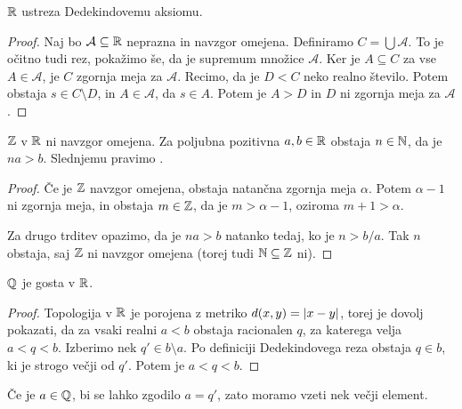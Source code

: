 \begin{trditev}
  $\mathbb{R}$ ustreza Dedekindovemu aksiomu.
\end{trditev}

\begin{proof}
  Naj bo $\mathcal{A} \subseteq \mathbb{R}$ neprazna in navzgor omejena.
  Definiramo $C = \bigcup \mathcal{A}$.
  To je očitno tudi rez, pokažimo še, da je supremum množice $\mathcal{A}$.
  Ker je $A \subseteq C$ za vse $A \in \mathcal{A}$, je $C$ zgornja meja za
  $\mathcal{A}$.
  Recimo, da je $D < C$ neko realno število.
  Potem obstaja $s \in C \setminus D$, in $A \in \mathcal{A}$, da $s \in A$.
  Potem je $A > D$ in $D$ ni zgornja meja za $\mathcal{A}$.
\end{proof}


\begin{posledica}
  $\mathbb{Z}$ v $\mathbb{R}$ ni navzgor omejena.
  Za poljubna pozitivna $a, b \in \mathbb{R}$ obstaja $n \in \mathbb{N}$, da je $na > b$.
  Slednjemu pravimo .
\end{posledica}

\begin{proof}
  Če je $\mathbb{Z}$ navzgor omejena, obstaja natančna zgornja meja $\alpha$.
  Potem $\alpha-1$ ni zgornja meja, in obstaja $m \in \mathbb{Z}$, da je $m > \alpha -
  1$, oziroma $m + 1 > \alpha$.
  \protislovje{}

  Za drugo trditev opazimo, da je $na >b$ natanko tedaj, ko je $n > b/a$.
  Tak $n$ obstaja, saj $\mathbb{Z}$ ni navzgor omejena (torej tudi $\mathbb{N} \subseteq \mathbb{Z}$
  ni).
\end{proof}

\begin{posledica}
  $\mathbb{Q}$ je gosta v $\mathbb{R}$.
\end{posledica}

\begin{proof}
  Topologija v $\mathbb{R}$ je porojena z metriko $d(x,y) = \left| x-y \right|$, torej je dovolj
  pokazati, da za vsaki realni $a < b$ obstaja racionalen $q$, za katerega velja
  $a < q < b$.
  Izberimo nek $q' \in b \setminus a$.
  Po definiciji Dedekindovega reza obstaja $q \in b$, ki je strogo večji od
  $q'$.
  Potem je $a < q < b$.
\end{proof}

\begin{opomba}
  Če je $a \in \mathbb{Q}$, bi se lahko zgodilo $a = q'$, zato moramo vzeti nek večji
  element.
\end{opomba}

